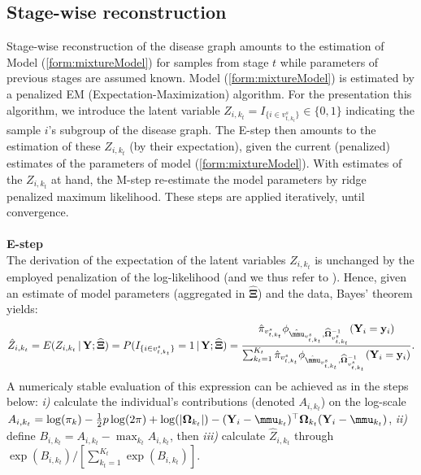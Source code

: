 \documentclass[10pt]{article}
\begin{document}
\subsection{Stage-wise reconstruction}\label{sec:stagewise}
Stage-wise reconstruction of the disease graph amounts to the estimation of Model (\ref{form:mixtureModel}) for samples from stage $t$ while parameters of previous stages are assumed known. Model (\ref{form:mixtureModel}) is estimated by a penalized EM (Expectation-Maximization) algorithm. For the presentation this algorithm, we introduce the latent variable $Z_{i, k_t} = I_{\{ i \in v_{t,k_{t}}^s \}} \in \{ 0, 1\}$ indicating the sample $i$'s subgroup of the disease graph. The E-step then amounts to the estimation of these $Z_{i,k_t}$ (by their expectation), given the current (penalized) estimates of the parameters of model (\ref{form:mixtureModel}). With estimates of the $Z_{i,k_t}$ at hand, the M-step re-estimate the model parameters by ridge penalized maximum likelihood. These steps are applied iteratively, until convergence.
\\
\vspace{-5pt}
\\
\textbf{E-step}
\\
The derivation of the expectation of the latent variables $Z_{i, k_t}$ is unchanged by the employed penalization of the log-likelihood (and we thus refer to \citet{Titt1985}). Hence, given an estimate of model parameters (aggregated in $\widehat{\mathbf{\Xi}}$) and the data, Bayes' theorem yields:
\begin{eqnarray*}
\hat{Z}_{i, k_t} = E( Z_{i, k_t} \, | \, \mathbf{Y}; \widehat{\mathbf{\Xi}} ) = P(I_{\{ i \in v_{t,k_{t}}^s \}} = 1 \, | \, \mathbf{Y}; \widehat{\mathbf{\Xi}}) =
\frac{\hat{\pi}_{v_{t, k_t}^s} \phi_{\hat{\mmu}_{v_{t, k_t}^s}, \widehat{\mathbf{\Omega}}_{v_{t, k_t}^s}^{-1}} ( \mathbf{Y}_i = \mathbf{y}_i )}{
\sum_{k_t=1}^{K_t}  \hat{\pi}_{v_{t, k_t}^s} \phi_{\hat{\mmu}_{v_{t, k_t}^s}, \widehat{\mathbf{\Omega}}_{v_{t, k_t}^s}^{-1}} ( \mathbf{Y}_i = \mathbf{y}_i )}.
\end{eqnarray*}
A numericaly stable evaluation of this expression can be achieved as in the steps below: \textit{i)} calculate the individual's contributions (denoted $A_{i,k_t}$) on the log-scale $A_{i,k_t} = \log(\pi_k) - \tfrac{1}{2} p  \log(2\pi) + \log(|\mathbf{\Omega}_{k_t}|) - (\mathbf{Y}_i-\mmu_{k_t})^{\top}\mathbf{\Omega}_{k_t} (\mathbf{Y}_i-\mmu_{k_t})$, \textit{ii)} define $B_{i,k_t} = A_{i,k_t} - \max_{k_t} A_{i,k_t}$, then \textit{iii)} calculate $\hat{Z}_{i, k_t}$ through $\exp(B_{i,k_t}) / [ \sum_{k_t=1}^{K_t} \exp(B_{i,k_t}) ]$.
\end{document}
